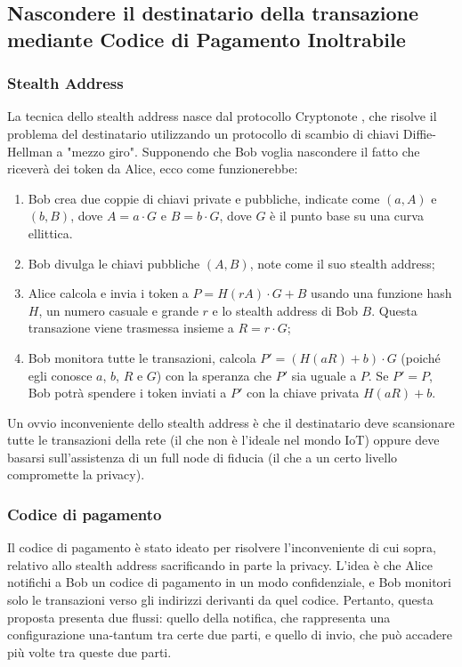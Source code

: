 \subsection{Nascondere il destinatario della transazione mediante Codice di Pagamento Inoltrabile}

\subsubsection{Stealth Address}
La tecnica dello stealth address nasce dal protocollo Cryptonote \cite{c28}, che risolve il problema del destinatario utilizzando un protocollo di scambio di chiavi Diffie-Hellman a "mezzo giro". Supponendo che Bob voglia nascondere il fatto che riceverà dei token da Alice, ecco come funzionerebbe:

\begin{enumerate}
	\item Bob crea due coppie di chiavi private e pubbliche, indicate come $(a, A)$ e $(b, B)$, dove $A = a\cdot G$ e $B = b\cdot G$, dove $G$ è il punto base su una curva ellittica.

	\item Bob divulga le chiavi pubbliche $(A, B)$, note come il suo stealth address;

	\item Alice calcola e invia i token a $P = H (rA)\cdot G + B$ usando una funzione hash $H$, un numero casuale e grande $r$  e lo stealth address di Bob $B$. Questa transazione viene trasmessa insieme a $R = r\cdot G$;
	\item  Bob monitora tutte le transazioni, calcola $P' = (H(aR) + b)\cdot G$ (poiché egli conosce $a$, $b$, $R$ e $G$) con la speranza che $P'$ sia uguale a $P$. Se $P' = P$, Bob potrà spendere i token inviati a $P'$ con la chiave privata $H(aR) + b$.
\end{enumerate}

Un ovvio inconveniente dello stealth address è che il destinatario deve scansionare tutte le transazioni della rete (il che non è l'ideale nel mondo IoT) oppure deve basarsi sull'assistenza di un full node di fiducia (il che a un certo livello compromette la privacy).

\subsubsection{Codice di pagamento}
Il codice di pagamento è stato ideato per risolvere l'inconveniente di cui sopra, relativo allo stealth address sacrificando in parte la privacy. L'idea è che Alice notifichi a Bob un codice di pagamento in un modo confidenziale, e Bob monitori solo le transazioni verso gli indirizzi derivanti da quel codice. Pertanto, questa proposta presenta due flussi: quello della notifica, che rappresenta una configurazione una-tantum tra certe due parti, e quello di invio, che può accadere più volte tra queste due parti.

